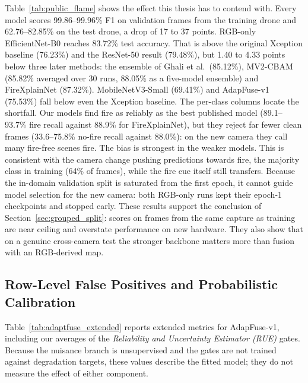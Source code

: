 Table~\ref{tab:public_flame} shows the effect this thesis has to contend with. Every model scores 99.86--99.96\% F1 on validation frames from the training drone and 62.76--82.85\% on the test drone, a drop of 17 to 37 points. RGB-only EfficientNet-B0 reaches 83.72\% test accuracy. That is above the original Xception baseline (76.23\%) and the ResNet-50 result (79.48\%), but 1.40 to 4.33 points below three later methods: the ensemble of Ghali et al.\ (85.12\%), MV2-CBAM (85.82\% averaged over 30 runs, 88.05\% as a five-model ensemble) and FireXplainNet (87.32\%). MobileNetV3-Small (69.41\%) and AdapFuse-v1 (75.53\%) fall below even the Xception baseline. The per-class columns locate the shortfall. Our models find fire as reliably as the best published model (89.1--93.7\% fire recall against 88.9\% for FireXplainNet), but they reject far fewer clean frames (33.6--75.8\% no-fire recall against 88.0\%): on the new camera they call many fire-free scenes fire. The bias is strongest in the weaker models. This is consistent with the camera change pushing predictions towards fire, the majority class in training (64\% of frames), while the fire cue itself still transfers. Because the in-domain validation split is saturated from the first epoch, it cannot guide model selection for the new camera: both RGB-only runs kept their epoch-1 checkpoints and stopped early. These results support the conclusion of Section~\ref{sec:grouped_split}: scores on frames from the same capture as training are near ceiling and overstate performance on new hardware. They also show that on a genuine cross-camera test the stronger backbone matters more than fusion with an RGB-derived map.

\subsection{Row-Level False Positives and Probabilistic Calibration}
\label{sec:adaptfuse_extended}

Table~\ref{tab:adaptfuse_extended} reports extended metrics for AdapFuse-v1, including our averages of the \textit{Reliability and Uncertainty Estimator (RUE)} gates. Because the nuisance branch is unsupervised and the gates are not trained against degradation targets, these values describe the fitted model; they do not measure the effect of either component.

